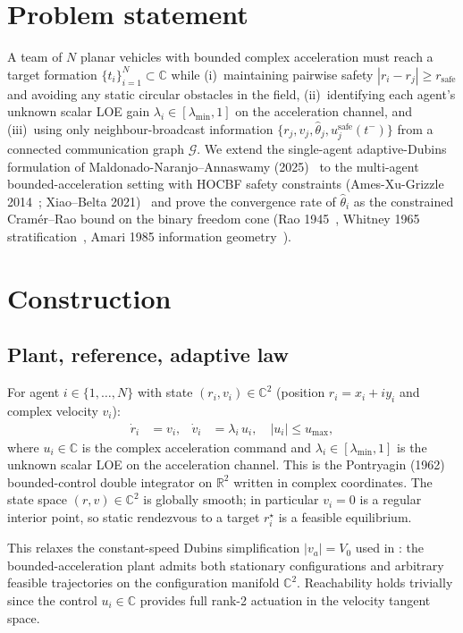 \documentclass[letterpaper,10pt,conference]{IEEEtran}
\newcommand{\C}{\mathbb{C}}
\newcommand{\rsafe}{r_{\text{safe}}}
\newcommand{\lammin}{\lambda_{\min}}
\newcommand{\thethat}{\hat\theta}
\begin{document}
\section{Problem statement}\label{sec:problem}
A team of $N$ planar vehicles with bounded complex acceleration must reach a target formation $\{t_i\}_{i=1}^N \subset \C$ while (i)~maintaining pairwise safety $|r_i - r_j| \ge \rsafe$ and avoiding any static circular obstacles in the field, (ii)~identifying each agent's unknown scalar LOE gain $\lambda_i \in [\lammin, 1]$ on the acceleration channel, and (iii)~using only neighbour-broadcast information $\{r_j, v_j, \thethat_j, u_j^{\text{safe}}(t^-)\}$ from a connected communication graph $\mathcal{G}$. We extend the single-agent adaptive-Dubins formulation of Maldonado-Naranjo--Annaswamy (2025)~\cite{maldonadoAnnaswamy2025} to the multi-agent bounded-acceleration setting with HOCBF safety constraints (Ames-Xu-Grizzle 2014~\cite{amesXuGrizzle2014}; Xiao--Belta 2021)~\cite{xiaoBelta2021} and prove the convergence rate of $\thethat_i$ as the constrained Cram\'er--Rao bound on the binary freedom cone (Rao 1945~\cite{rao1945}, Whitney 1965 stratification~\cite{whitney1965}, Amari 1985 information geometry~\cite{amari1985}).

\section{Construction}

\subsection{Plant, reference, adaptive law}\label{sec:plant}
For agent $i \in \{1, \ldots, N\}$ with state $(r_i, v_i) \in \mathbb{C}^2$ (position $r_i = x_i + i y_i$ and complex velocity $v_i$):
\begin{align}
\dot r_i &= v_i, & \dot v_i &= \lambda_i\, u_i,\quad |u_i|\le u_{\max}, \label{eq:plant}
\end{align}
where $u_i \in \mathbb{C}$ is the complex acceleration command and $\lambda_i \in [\lambda_{\min}, 1]$ is the unknown scalar LOE on the acceleration channel. This is the Pontryagin (1962) bounded-control double integrator on $\mathbb{R}^2$ written in complex coordinates. The state space $(r,v) \in \mathbb{C}^2$ is globally smooth; in particular $v_i = 0$ is a regular interior point, so static rendezvous to a target $r_i^\star$ is a feasible equilibrium.

This relaxes the constant-speed Dubins simplification $|v_a|=V_0$ used in \cite{maldonadoAnnaswamy2025}: the bounded-acceleration plant admits both stationary configurations and arbitrary feasible trajectories on the configuration manifold $\mathbb{C}^2$. Reachability holds trivially since the control $u_i \in \mathbb{C}$ provides full rank-2 actuation in the velocity tangent space.
\end{document}
